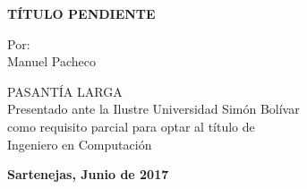 
\begin{titlepage}
\begin{center}

\usbheader

\bigskip
\bigskip
\bigskip
\bigskip
\bigskip
\bigskip
\bigskip
\bigskip
\bigskip
\bigskip
\bigskip
\bigskip
\bigskip
\bigskip
\bigskip
\bigskip

\textsc{\bfseries TÍTULO PENDIENTE} %

\bigskip
\bigskip
\bigskip
\bigskip
\bigskip
\bigskip
\bigskip

\begin{minipage}{\textwidth}
\centering
Por: \\
Manuel Pacheco \\


\end{minipage}

\bigskip
\bigskip
\bigskip
\bigskip
\bigskip
\bigskip
\bigskip
\bigskip
\bigskip

{PASANTÍA LARGA \\ Presentado ante la Ilustre Universidad Simón Bolívar \\
como requisito parcial para optar al título de \\ Ingeniero en Computación} \\

\bigskip
\bigskip
\vfill

{\large \bfseries Sartenejas, Junio de 2017}

\end{center}
\end{titlepage}
